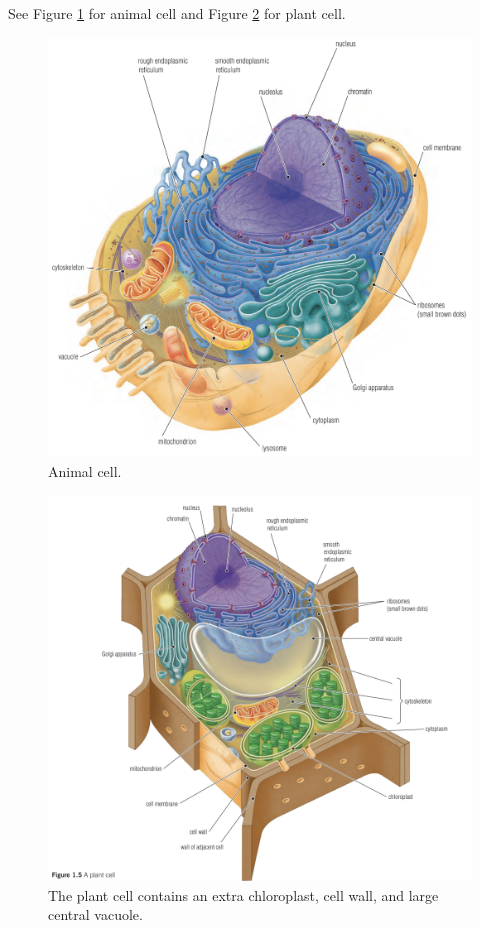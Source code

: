 \documentclass[12pt]{report}
\begin{document}
See Figure \ref{fig:animal-cell} for animal cell and Figure \ref{fig:plant-cell} for plant cell.

\begin{figure}[H]
\centering
    \includegraphics[width= \textwidth ]{../figures/animal cell.png}
    \caption{Animal cell.}
    \label{fig:animal-cell}
\end{figure}

\begin{figure}[H]
\centering
    \includegraphics[width= \textwidth ]{../figures/plant cell.png}
    \caption{The plant cell contains an extra chloroplast, cell wall, and large central vacuole.}
    \label{fig:plant-cell}
\end{figure}
\end{document}
